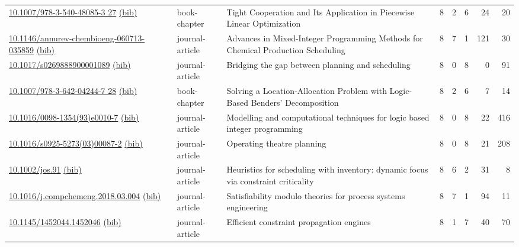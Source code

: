 {\begin{longtable}{p{5cm}lp{11cm}rrrrr}
\href{http://dx.doi.org/10.1007/978-3-540-48085-3_27}{10.1007/978-3-540-48085-3 27} \href{https://www.doi2bib.org/bib/10.1007/978-3-540-48085-3_27}{(bib)} & book-chapter & Tight Cooperation and Its Application in Piecewise Linear Optimization & 8 & 2 & 6 & 24 & 20 \\
\href{http://dx.doi.org/10.1146/annurev-chembioeng-060713-035859}{10.1146/annurev-chembioeng-060713-035859} \href{https://www.doi2bib.org/bib/10.1146/annurev-chembioeng-060713-035859}{(bib)} & journal-article & Advances in Mixed-Integer Programming Methods for Chemical Production Scheduling & 8 & 7 & 1 & 121 & 30 \\
\href{http://dx.doi.org/10.1017/s0269888900001089}{10.1017/s0269888900001089} \href{https://www.doi2bib.org/bib/10.1017/s0269888900001089}{(bib)} & journal-article & Bridging the gap between planning and scheduling & 8 & 0 & 8 & 0 & 91 \\
\href{http://dx.doi.org/10.1007/978-3-642-04244-7_28}{10.1007/978-3-642-04244-7 28} \href{https://www.doi2bib.org/bib/10.1007/978-3-642-04244-7_28}{(bib)} & book-chapter & Solving a Location-Allocation Problem with Logic-Based Benders' Decomposition & 8 & 2 & 6 & 7 & 14 \\
\href{http://dx.doi.org/10.1016/0098-1354(93)e0010-7}{10.1016/0098-1354(93)e0010-7} \href{https://www.doi2bib.org/bib/10.1016/0098-1354(93)e0010-7}{(bib)} & journal-article & Modelling and computational techniques for logic based integer programming & 8 & 0 & 8 & 22 & 416 \\
\href{http://dx.doi.org/10.1016/s0925-5273(03)00087-2}{10.1016/s0925-5273(03)00087-2} \href{https://www.doi2bib.org/bib/10.1016/s0925-5273(03)00087-2}{(bib)} & journal-article & Operating theatre planning & 8 & 0 & 8 & 21 & 208 \\
\href{http://dx.doi.org/10.1002/jos.91}{10.1002/jos.91} \href{https://www.doi2bib.org/bib/10.1002/jos.91}{(bib)} & journal-article & Heuristics for scheduling with inventory: dynamic focus via constraint criticality & 8 & 6 & 2 & 31 & 8 \\
\href{http://dx.doi.org/10.1016/j.compchemeng.2018.03.004}{10.1016/j.compchemeng.2018.03.004} \href{https://www.doi2bib.org/bib/10.1016/j.compchemeng.2018.03.004}{(bib)} & journal-article & Satisfiability modulo theories for process systems engineering & 8 & 7 & 1 & 94 & 11 \\
\href{http://dx.doi.org/10.1145/1452044.1452046}{10.1145/1452044.1452046} \href{https://www.doi2bib.org/bib/10.1145/1452044.1452046}{(bib)} & journal-article & Efficient constraint propagation engines & 8 & 1 & 7 & 40 & 70 \\

\end{longtable}}
